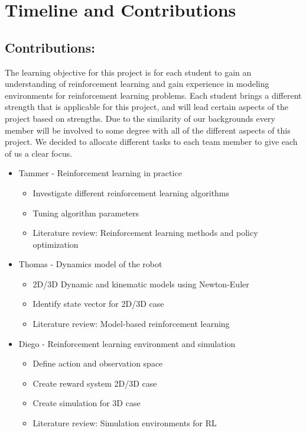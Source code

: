\documentclass{article}
\begin{document}
\section{Timeline and Contributions}

\subsection{Contributions:}
The learning objective for this project is for each student to gain an understanding of reinforcement learning and gain experience in modeling environments for reinforcement learning problems. Each student brings a different strength that is applicable for this project, and will lead certain aspects of the project based on strengths. Due to the similarity of our backgrounds every member will be involved to some degree with all of the different aspects of this project. We decided to allocate different tasks to each team member to give each of us a clear focus.

\begin{itemize}
    \item Tammer - Reinforcement learning in practice
        \begin{itemize}
            \item Investigate different reinforcement learning algorithms
            \item Tuning algorithm parameters
            \item Literature review: Reinforcement learning methods and policy optimization
        \end{itemize}
    \item Thomas - Dynamics model of the robot 
        \begin{itemize}
            \item 2D/3D Dynamic and kinematic models using Newton-Euler 
            \item Identify state vector for 2D/3D case
            \item Literature review: Model-based reinforcement learning
        \end{itemize}
    \item Diego - Reinforcement learning environment and simulation  
        \begin{itemize} 
            \item Define action and observation space
            \item Create reward system 2D/3D case
            \item Create simulation for 3D case
            \item Literature review: Simulation environments for RL
        \end{itemize}
\end{itemize}
\end{document}
